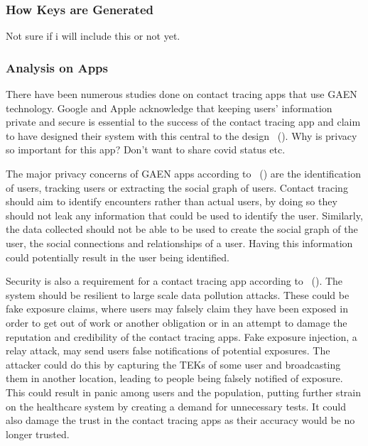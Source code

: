 \subsubsection{How Keys are Generated}
Not sure if i will include this or not yet.
\subsubsection{Analysis on Apps}
There have been numerous studies done on contact tracing apps that use GAEN technology. Google and Apple acknowledge that keeping users' information private and secure is essential to the success of the contact tracing app and claim to have designed their system with this central to the design ~(\cite{12345}).  Why is privacy so important for this app? Don't want to share covid status etc.\par
The major privacy concerns of GAEN apps according to ~(\cite{9931613}) are the identification of users, tracking users or extracting the social graph of users. Contact tracing should aim to identify encounters rather than actual users, by doing so they should not leak any information that could be used to identify the user. Similarly, the data collected should not be able to be used to create the social graph of the user, the social connections and relationships of a user. Having this information could potentially result in the user being identified. \par
Security is also a requirement for a contact tracing app according to ~(\cite{9931613}). The system should be resilient to large scale data pollution attacks. These could be fake exposure claims, where users may falsely claim they have been exposed in order to get out of work or another obligation or in an attempt to damage the reputation and credibility of the contact tracing apps. Fake exposure injection, a relay attack, may send users false notifications of potential exposures. The attacker could do this by capturing the TEKs of some user and broadcasting them in another location, leading to people being falsely notified of exposure. This could result in panic among users and the population, putting further strain on the healthcare system by creating a demand for unnecessary tests. It could also damage the trust in the contact tracing apps as their accuracy would be no longer trusted. \par
